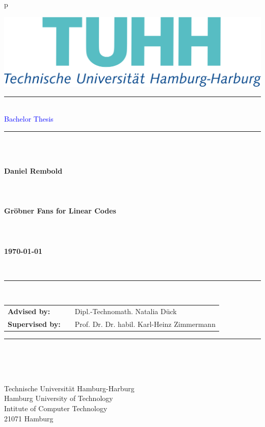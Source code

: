 \begin{tabular}{p{\textwidth}}
\begin{flushright}
\includegraphics[scale=0.15]{figures/tuhh.png}
\end{flushright}


\textcolor{gray}{\rule{15cm}{.8pt}}\\
\large{\textsf{\textcolor{blue}{Bachelor Thesis}}} \\
\textcolor{gray}{\rule{15cm}{.8pt}}

~\\
~\\



\begin{flushright}
\textbf{\LARGE{Daniel Rembold}}
~\\
~\\
~\\
~\\
\textbf{\LARGE{Gröbner Fans for Linear Codes}}
~\\
~\\
~\\
~\\
\textbf{\large{\today}}
\end{flushright}

~\\
\begin{center}
\textcolor{gray}{\rule{15cm}{.8pt}}\\
\begin{tabular}{lll}
\textbf{Advised by:} & & Dipl.-Technomath. Natalia D\"uck \\
\textbf{Supervised by:} & & Prof. Dr. Dr. habil. Karl-Heinz Zimmermann\\
\end{tabular}
\textcolor{gray}{\rule{15cm}{.8pt}}\\
\end{center}

~\\
~\\


Technische Universität Hamburg-Harburg\\
Hamburg University of Technology\\
Intitute of Computer Technology \\
21071 Hamburg

\end{tabular}


